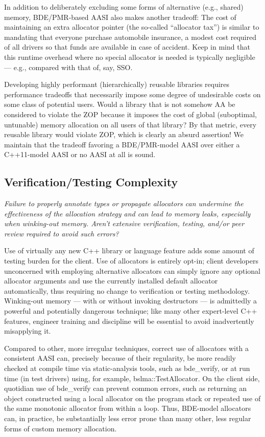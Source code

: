 In addition to deliberately excluding some forms of alternative (e.g., shared) memory,
BDE/PMR-based AASI also makes another tradeoff: The cost of maintaining an
extra allocator pointer (the so-called “allocator tax”) is similar to mandating that
everyone purchase automobile insurance, a modest cost required of all drivers so
that funds are available in case of accident. Keep in mind that this runtime
overhead where no special allocator is needed is typically negligible — e.g.,
compared with that of, say, SSO.

Developing highly performant (hierarchically) reusable libraries requires
performance tradeoffs that necessarily impose some degree of undesirable costs on
some class of potential users. Would a library that is not somehow AA be considered
to violate the ZOP because it imposes the cost of global (suboptimal, untunable)
memory allocation on all users of that library? By that metric, every reusable library
would violate ZOP, which is clearly an absurd assertion! We maintain that the
tradeoff favoring a BDE/PMR-model AASI over either a C++11-model AASI or no
AASI at all is sound.

\subsection{Verification/Testing Complexity}
\emph{Failure to properly annotate types or propagate allocators can undermine the
effectiveness of the allocation strategy and can lead to memory leaks, especially when
winking-out memory. Aren’t extensive verification, testing, and/or peer review
required to avoid such errors?}

Use of virtually any new C++ library or language feature adds some amount of
testing burden for the client. Use of allocators is entirely opt-in; client developers
unconcerned with employing alternative allocators can simply ignore any optional
allocator arguments and use the currently installed default allocator automatically,
thus requiring no change to verification or testing methodology. Winking-out
memory — with or without invoking destructors — is admittedly a powerful and
potentially dangerous technique; like many other expert-level C++ features, engineer
training and discipline will be essential to avoid inadvertently misapplying it.

Compared to other, more irregular techniques, correct use of allocators with a
consistent AASI can, precisely because of their regularity, be more readily checked
at compile time via static-analysis tools, such as bde_verify, or at run time (in test
drivers) using, for example, bslma::TestAllocator. On the client side, quotidian
use of bde_verify can prevent common errors, such as returning an object
constructed using a local allocator on the program stack or repeated use of the same
monotonic allocator from within a loop. Thus, BDE-model allocators can, in
practice, be substantially less error prone than many other, less regular forms of
custom memory allocation.

